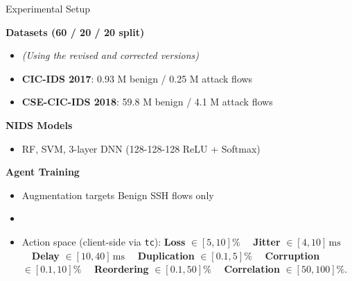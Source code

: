 

\begin{frame}{Experimental Setup}

	\scriptsize

	\textbf{Datasets (60 / 20 / 20 split)}

	\begin{itemize}
		\item [] \textit{(Using the revised and corrected versions)}
		\item \textbf{CIC-IDS 2017}: 0.93 M benign / 0.25 M attack flows
		\item \textbf{CSE-CIC-IDS 2018}: 59.8 M benign / 4.1 M attack flows
	\end{itemize}

	\textbf{NIDS Models}
	\begin{itemize}
		\item RF, SVM, 3-layer DNN (128-128-128 ReLU + Softmax)
	\end{itemize}


	\textbf{Agent Training}
	\begin{itemize}
		\item Augmentation targets Benign SSH flows only
		\item []
		\item Action space (client-side via \texttt{tc}):
		      \textbf{Loss} $\in [5,10]\%$ \ \textbar\
		      \textbf{Jitter} $\in [4,10]\,\mathrm{ms}$ \ \textbar\
		      \textbf{Delay} $\in [10,40]\,\mathrm{ms}$ \ \textbar\
		      \textbf{Duplication} $\in [0.1,5]\%$ \ \textbar\
		      \textbf{Corruption} $\in [0.1,10]\%$ \ \textbar\
		      \textbf{Reordering} $\in [0.1,50]\%$ \ \textbar\
		      \textbf{Correlation} $\in [50,100]\%$.

	\end{itemize}

\end{frame}


